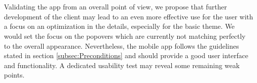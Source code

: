 \\
\\
Validating the app from an overall point of view, we propose that further development of the client may lead to an even more effective use for the user with a focus on an optimization in the details, especially for the basic theme. We would set the focus on the popovers which are currently not matching perfectly to the overall appearance. Nevertheless, the mobile app follows the guidelines stated in section \ref{subsec:Preconditions}  and should provide a good user interface and functionality. A dedicated usability test may reveal some remaining weak points.